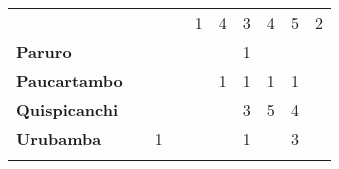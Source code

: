\begin{tabular}{lccccccccc}
	&\cellcolor[HTML]{FCC46C}					&\cellcolor[HTML]{FCC46C}  					&\cellcolor[HTML]{FCC46C} 		            &1 					
	&4 											&3
	&4											&5
	&2\\
	\textbf{Paruro}                            
	&\cellcolor[HTML]{FCC46C}                   &\cellcolor[HTML]{FCC46C}   				&\cellcolor[HTML]{FCC46C} 					&\cellcolor[HTML]{FCC46C}		 			&\cellcolor[HTML]{FCC46C}					
	&1
	&\cellcolor[HTML]{FCC46C}					&\cellcolor[HTML]{FCC46C}
	&\cellcolor[HTML]{FCC46C} \\
	\textbf{Paucartambo}               		                       
	&\cellcolor[HTML]{FCC46C}					
	&\cellcolor[HTML]{FCC46C}					&\cellcolor[HTML]{FCC46C}                   &\cellcolor[HTML]{FCC46C} 					&1
	&1											&1		
	&1											&\cellcolor[HTML]{FCC46C}\\
	\textbf{Quispicanchi}                                         	                  			
	&\cellcolor[HTML]{FCC46C}					&\cellcolor[HTML]{FCC46C}					&\cellcolor[HTML]{FCC46C} 
	&\cellcolor[HTML]{FCC46C}					&\cellcolor[HTML]{FCC46C}
	&3											&5
	&4											&\cellcolor[HTML]{FCC46C}\\
	\textbf{Urubamba}                                                          		
	&\cellcolor[HTML]{FCC46C}					&1
	&\cellcolor[HTML]{FCC46C}					&\cellcolor[HTML]{FCC46C}
	&\cellcolor[HTML]{FCC46C}					&1
	&\cellcolor[HTML]{FCC46C}					&3
	&\cellcolor[HTML]{FCC46C}
	\\	
	&\multicolumn{1}{l}{}                       &\multicolumn{1}{l}{}            &\multicolumn{1}{l}{}                         
	&\multicolumn{1}{l}{}                       &\multicolumn{1}{l}{}            &\multicolumn{1}{l}{}                       &\multicolumn{1}{l}{}                       &\multicolumn{1}{l}{}            &\multicolumn{1}{l}{}    
\end{tabular}